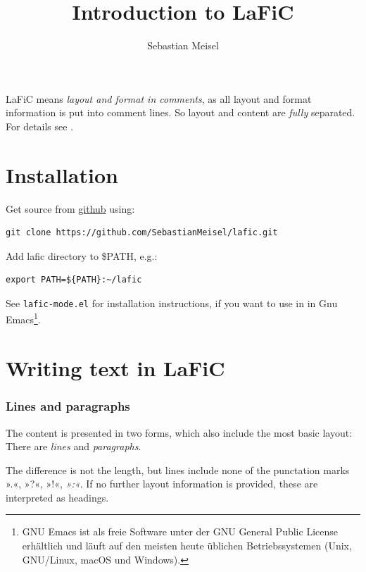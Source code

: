 \documentclass{article}
\title{Introduction to LaFiC}
\author{Sebastian Meisel}
\begin{document}
\maketitle


{LaFiC means \textit{layout and format in comments}, as all layout and
format information is put into comment lines. So layout and
content are \emph{fully} separated. For details see \xspace .\\}

\part{Installation}
\label{}

{Get source from \href{https://github.com}{github} using:\\}

\begin{verbatim}
git clone https://github.com/SebastianMeisel/lafic.git
\end{verbatim}


{Add lafic directory to \$PATH, e.g.:\\}

\begin{verbatim}
export PATH=${PATH}:~/lafic
\end{verbatim}


{See \texttt{lafic-mode.el} for installation instructions, if you want
to use in in Gnu Emacs\footnote{GNU Emacs ist als freie Software unter der GNU General Public License erhältlich und läuft auf den meisten heute üblichen Betriebssystemen (Unix, GNU/Linux, macOS und Windows).}\xspace .\\}

\part{Writing text in LaFiC}
\label{Writing}

\section{Lines and paragraphs}
\label{}

{The content is presented in two forms, which also include
the most basic layout: There are \emph{lines} and \emph{paragraphs}.\\}

{The difference is not the length, but lines include
none of the punctation marks ».«, »?«, »!«, \emph{»:«}. If no
further layout information is provided, these are
interpreted as headings.\\}
\end{document}
